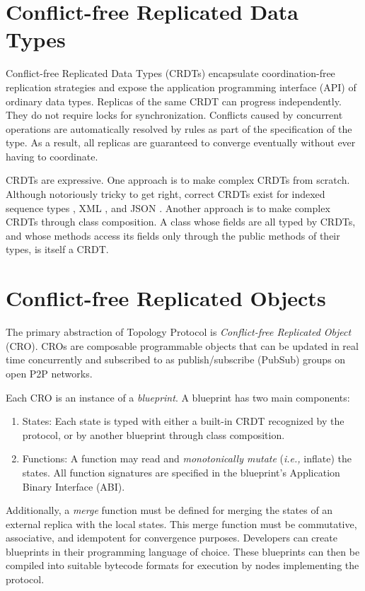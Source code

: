 \documentclass{article}
\begin{document}
\section{Conflict-free Replicated Data Types}
\label{sec:headings}

Conflict-free Replicated Data Types (CRDTs) encapsulate coordination-free replication strategies and expose the application programming interface (API) of ordinary data types. Replicas of the same CRDT can progress independently. They do not require locks for synchronization. Conflicts caused by concurrent operations are automatically resolved by rules as part of the specification of the type. As a result, all replicas are guaranteed to converge eventually without ever having to coordinate.

CRDTs are expressive. One approach is to make complex CRDTs from scratch. Although notoriously tricky to get right, correct CRDTs exist for indexed sequence types \cite{Lseq, RGA, YATA, Fugue}, XML \cite{XML-CRDT}, and JSON \cite{JSON-CRDT}. Another approach is to make complex CRDTs through class composition. A class whose fields are all typed by CRDTs, and whose methods access its fields only through the public methods of their types, is itself a CRDT.

\section{Conflict-free Replicated Objects}
\label{sec:headings}

The primary abstraction of Topology Protocol is \textit{Conflict-free Replicated Object} (CRO). CROs are composable programmable objects that can be updated in real time concurrently and subscribed to as publish/subscribe (PubSub) groups on open P2P networks.

Each CRO is an instance of a \textit{blueprint}. A blueprint has two main components:
\begin{enumerate}
    \item States: Each state is typed with either a built-in CRDT recognized by the protocol, or by another blueprint through class composition.
    \item Functions: A function may read and \textit{monotonically mutate} (\textit{i.e.,} inflate) the states. All function signatures are specified in the blueprint's Application Binary Interface (ABI).
\end{enumerate}
Additionally, a \textit{merge} function must be defined for merging the states of an external replica with the local states. This merge function must be commutative, associative, and idempotent for convergence purposes. Developers can create blueprints in their programming language of choice. These blueprints can then be compiled into suitable bytecode formats for execution by nodes implementing the protocol.
\end{document}
